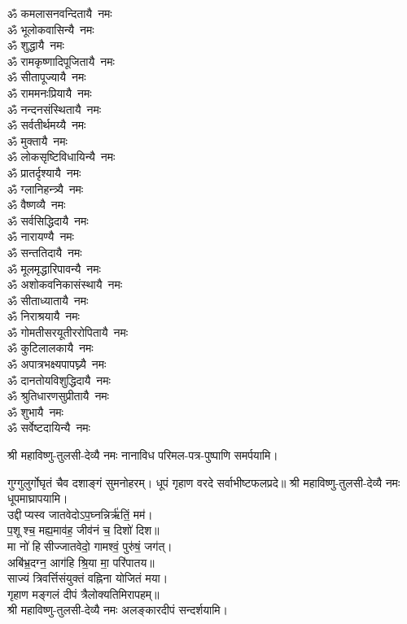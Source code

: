 \begin{multicols}{2}
\begin{flushleft}
ॐ कमलासनवन्दितायै~नमः\\
ॐ भूलोकवासिन्यै~नमः\\
ॐ शुद्धायै~नमः\\
ॐ रामकृष्णादिपूजितायै~नमः\\
ॐ सीतापूज्यायै~नमः\\
ॐ राममनःप्रियायै~नमः\\
ॐ नन्दनसंस्थितायै~नमः\\
ॐ सर्वतीर्थमय्यै~नमः\\
ॐ मुक्तायै~नमः\hfill{}‌\\
ॐ लोकसृष्टिविधायिन्यै~नमः\\
ॐ प्रातर्दृश्यायै~नमः\\
ॐ ग्लानिहन्त्र्यै~नमः\\
ॐ वैष्णव्यै~नमः\\
ॐ सर्वसिद्धिदायै~नमः\\
ॐ नारायण्यै~नमः\\
ॐ सन्ततिदायै~नमः\\
ॐ मूलमृद्धारिपावन्यै~नमः\\
ॐ अशोकवनिकासंस्थायै~नमः\\
ॐ सीताध्यातायै~नमः\hfill{}‌\\
ॐ निराश्रयायै~नमः\\
ॐ गोमतीसरयूतीररोपितायै~नमः\\
ॐ कुटिलालकायै~नमः\\
ॐ अपात्रभक्ष्यपापघ्न्यै~नमः\\
ॐ दानतोयविशुद्धिदायै~नमः\\
ॐ श्रुतिधारणसुप्रीतायै~नमः\\
ॐ शुभायै~नमः\\
ॐ सर्वेष्टदायिन्यै~नमः\hfill{}\\
\end{flushleft}
\end{multicols}
श्री महाविष्णु-तुलसी-देव्यै नमः नानाविध परिमल-पत्र-पुष्पाणि समर्पयामि।


गुग्गुलुर्गोघृतं चैव दशाङ्गं सुमनोहरम्।
धूपं गृहाण वरदे सर्वाभीष्टफलप्रदे॥
श्री महाविष्णु-तुलसी-देव्यै नमः धूपमाघ्रापयामि।\\

उद्दीप्यस्व जातवेदोऽप॒घ्नन्निर्ऋ॑तिं॒ मम॑।\\
 प॒शूश्च॒ मह्य॒माव॑ह॒ जीव॑नं च॒ दिशो॑ दिश॥ \\
मा नो॑ हिसीज्जातवेदो॒ गामश्वं॒ पुरु॑षं॒ जग॑त्।\\
अबि॑भ्र॒दग्न॒ आग॑हि श्रि॒या मा॒ परि॑पातय॥ \\
साज्यं त्रिवर्त्तिसंयुक्तं वह्निना योजितं मया।\\
गृहाण मङ्गलं दीपं त्रैलोक्यतिमिरापहम्॥ \\
श्री महाविष्णु-तुलसी-देव्यै नमः अलङ्कारदीपं सन्दर्शयामि।\\

